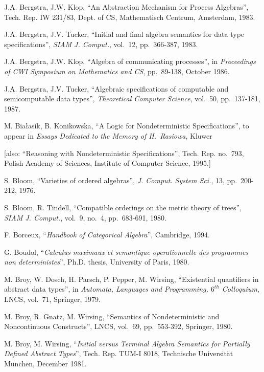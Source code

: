  J.A. Bergstra, J.W. Klop, ``{An Abstraction Mechanism 
for Process Algebras}'', Tech.  Rep.  IW 231/83, Dept.  of CS, Mathematisch 
Centrum, Amsterdam, 1983.

 J.A. Bergstra, J.V. Tucker, ``Initial and final algebra 
semantics for data type specifications'', {\em SIAM J. Comput.}, vol.~12, 
pp.~366-387, 1983.

 J.A. Bergstra, J.W. Klop, ``Algebra of communicating 
processes'', in {\em Proceedings of CWI Symposium on Mathematics and CS}, 
pp.~89-138, October 1986.

 J.A. Bergstra, J.V. Tucker, ``Algebraic specifications 
of computable and semicomputable data types'', {\em Theoretical Computer 
Science}, vol.~50, pp.~137-181, 1987.

 M. Bia{\l}asik, B. Konikowska, ``A Logic for Nondeterministic
Specifications'', to appear in {\em Essays Dedicated to the Memory of H.~Rasiowa}, Kluwer

{\small{[also: ``Reasoning with 
Nondeterministic Specifications'', Tech.  Rep.  no.~793, Polish Academy of 
Sciences, Institute of Computer Science, 1995.]}\normalsize}

 S. Bloom, ``Varieties of ordered algebras'', {\em J. 
Comput.  System Sci.}, 13, pp.~200-212, 1976.

 S. Bloom, R. Tindell, ``Compatible orderings on the 
metric theory of trees'', {\em SIAM J. Comput.}, vol.~9, no.~4, pp.~683-691, 
1980.

 F. Borceux, ``{\em Handbook of Categorical Algebra}'', 
Cambridge, 1994.

 G. Boudol, ``{\em Calculus maximaux et semantique 
operationnelle des programmes non deterministes}'', Ph.D. thesis, 
University of Paris, 1980.

 M. Broy, W. Dosch, H. Parsch, P. Pepper, M. Wirsing, 
``Existential quantifiers in abstract data types'', in {\em Automata, 
Languages and Programming, $6^{th}$ Colloquium}, LNCS, vol.~71, Springer, 
1979.

 M. Broy, R. Gnatz, M. Wirsing, ``Semantics of 
Nondeterministic and Noncontinuous Constructs'', LNCS, vol.~69,  pp.~553-392, 
Springer, 1980.

 M. Broy, M. Wirsing, ``{\em Initial versus Terminal Algebra 
Semantics for Partially Defined Abstract Types}'', Tech.  Rep.  TUM-I 8018, 
Technische Universit\"{a}t M\"{u}nchen, December 1981. 

